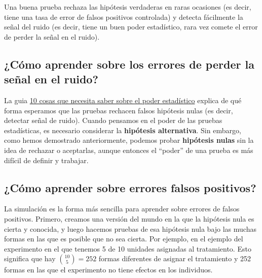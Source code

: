 \documentclass[
]{article}
\begin{document}
Una buena prueba rechaza las hipótesis verdaderas en raras ocasiones (es decir, tiene una tasa de error de falsos positivos controlada) y detecta fácilmente la señal del ruido (es decir, tiene un buen poder estadístico, rara vez comete el error de perder la señal en el ruido).

\hypertarget{cuxf3mo-aprender-sobre-los-errores-de-perder-la-seuxf1al-en-el-ruido}{%
\subsection{¿Cómo aprender sobre los errores de perder la señal en el ruido?}\label{cuxf3mo-aprender-sobre-los-errores-de-perder-la-seuxf1al-en-el-ruido}}

La guia \href{https://egap.org/resource/10-things-to-know-about-statistical-power}{10 cosas que necesita saber sobre el poder estadístico} explica de qué forma esperamos que las pruebas rechacen falsos hipótesis nulas (es decir, detectar señal de ruido). Cuando pensamos en el poder de las pruebas estadísticas, es necesario considerar la \textbf{hipótesis alternativa}. Sin embargo, como hemos demostrado anteriormente, podemos probar \textbf{hipótesis nulas} sin la idea de rechazar o aceptarlas, aunque entonces el ``poder'' de una prueba es más difícil de definir y trabajar.

\hypertarget{cuxf3mo-aprender-sobre-errores-falsos-positivos}{%
\subsection{¿Cómo aprender sobre errores falsos positivos?}\label{cuxf3mo-aprender-sobre-errores-falsos-positivos}}

La simulación es la forma más sencilla para aprender sobre errores de falsos positivos. Primero, creamos una versión del mundo en la que la hipótesis nula es cierta y conocida, y luego hacemos pruebas de esa hipótesis nula bajo las muchas formas en las que es posible que no sea cierta. Por ejemplo, en el ejemplo del experimento en el que tenemos 5 de 10 unidades asignadas al tratamiento. Esto significa que hay \(\binom {10} {5} = 252\) formas diferentes de asignar el tratamiento y 252 formas en las que el experimento no tiene efectos en los individuos.
\end{document}
